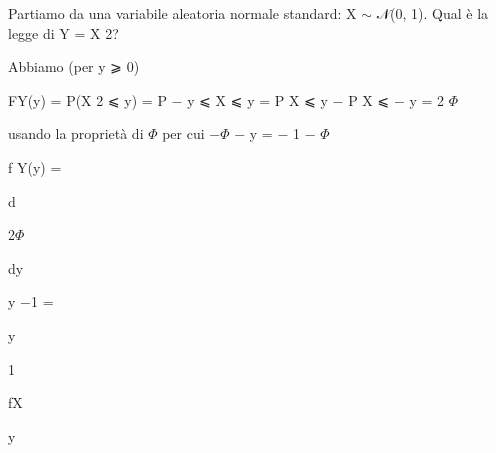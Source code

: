 \documentclass[a4paper,portrait,12pt]{article}
\begin{document}
\begin{flushleft}
Partiamo da una variabile aleatoria normale standard: X $\sim$ 𝒩(0, 1). Qual \`{e} la legge di Y = X 2?
\end{flushleft}


\begin{flushleft}
Abbiamo (per y ⩾ 0)
\end{flushleft}


\begin{flushleft}
FY(y) = P(X 2 ⩽ y) = P $-$ y ⩽ X ⩽ y = P X ⩽ y $-$ P X ⩽ $-$ y = 2 $\Phi$
\end{flushleft}


\begin{flushleft}
usando la propriet\`{a} di $\Phi$ per cui $-$$\Phi$ $-$ y = $-$ 1 $-$ $\Phi$
\end{flushleft}


\begin{flushleft}
f Y(y) =
\end{flushleft}





\begin{flushleft}
d
\end{flushleft}


\begin{flushleft}
2$\Phi$
\end{flushleft}


\begin{flushleft}
dy
\end{flushleft}





\begin{flushleft}
y $-$1 =
\end{flushleft}





\begin{flushleft}
y
\end{flushleft}





1


\begin{flushleft}
fX
\end{flushleft}


\begin{flushleft}
y
\end{flushleft}
\end{document}
